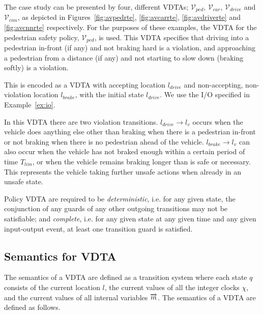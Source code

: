 \begin{example}
	The case study can be presented by four, different \acp{VDTA}; $\mathcal{V}_{ped}$, $\mathcal{V}_{car}$, $\mathcal{V}_{drive}$ and $\mathcal{V}_{cnn}$, as depicted in Figures~\ref{fig:avpedrte}, \ref{fig:avcarrte}, \ref{fig:avdriverte} and \ref{fig:avcnnrte} respectively. 
	For the purposes of these examples, the \ac{VDTA} for the pedestrian safety policy, $\mathcal{V}_{ped}$, is used.
	This \ac{VDTA} specifies that driving into a pedestrian in-front (if any) and not braking hard is a violation, and approaching a pedestrian from a distance (if any) and not starting to slow down (braking softly) is a violation.
	
	This is encoded as a \ac{VDTA} with accepting location $l_{drive}$ and non-accepting, non-violation location $l_{brake}$, with the initial state $l_{drive}$.
	We use the I/O specified in Example~\ref{ex:io}.
	
	In this \ac{VDTA} there are two violation transitions.
	$l_{drive} \rightarrow l_v$ occurs when the vehicle does anything else other than braking when there is a pedestrian in-front or not braking when there is no pedestrian ahead of the vehicle.
	$l_{brake} \rightarrow l_v$ can also occur when the vehicle has not braked enough within a certain period of time $T_{lim}$, or when the vehicle remains braking longer than is safe or necessary.
	This represents the vehicle taking further unsafe actions when already in an unsafe state.
\end{example}

Policy \ac{VDTA} are required to be \textit{deterministic}, i.e. for any given state, the conjunction of any guards of any other outgoing transitions may not be satisfiable; and \textit{complete}, i.e. for any given state at any given time and any given input-output event, at least one transition guard is satisfied.

\subsection{Semantics for \ac{VDTA}}

The semantics of a \ac{VDTA} are defined as a transition system where each state $q$ consists of the current location $l$, the current values of all the integer clocks $\chi$, and the current values of all internal variables $\overrightarrow{m}$.
The semantics of a \ac{VDTA} are defined as follows.

